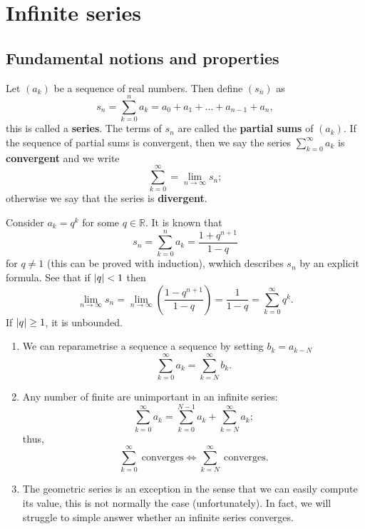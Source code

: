 \chapter{Infinite series}

\section{Fundamental notions and properties}

\begin{definition}
    Let $(a_k)$ be a sequence of real numbers. Then define $(s_n)$ as \[ s_n = \sum_{k = 0}^n a_k = a_0 + a_1 + \ldots + a_{n - 1} + a_{n}, \] this is called a \textbf{series}. The terms of $s_n$ are called the \textbf{partial sums} of $(a_k)$. If the sequence of partial sums is convergent, then we say the series $\sum_{k = 0}^\infty a_k$ is \textbf{convergent} and we write \[ \sum_{k = 0}^\infty = \lim_{n \to \infty} s_n; \] otherwise we say that the series is \textbf{divergent}.
\end{definition}

\begin{example}
    Consider $a_k = q^k$ for some $q \in \mathbb R$. It is known that \[ s_n = \sum_{k = 0}^n a_k =\frac{1 + q^{n + 1}}{1 - q} \] for $q \neq 1$ (this can be proved with induction), wwhich describes $s_n$ by an explicit formula. See that if $\lvert q\rvert < 1$ then \[ \lim_{n \to \infty} s_n = \lim_{n \to \infty} \left( \frac{1 - q^{n + 1}}{1 - q} \right) = \frac{1}{1 - q} = \sum_{k = 0}^\infty q^k. \] If $\lvert q\rvert \geq 1$, it is unbounded.
\end{example}

\begin{remark}
    \begin{enumerate}
        \item We can reparametrise a sequence a sequence by setting $b_k = a_{k - N}$ \[ \sum_{k = 0}^\infty a_k = \sum_{k = N}^\infty b_k. \]
        \item Any number of finite are unimportant in an infinite series: \[ \sum_{k = 0}^\infty a_k = \sum_{k = 0}^{N - 1} a_k + \sum_{k = N}^\infty a_k; \] thus, \[ \sum_{k = 0}^\infty \; \text{converges} \iff \sum_{k = N}^\infty \; \text{converges}. \]
        \item The geometric series is an exception in the sense that we can easily compute its value, this is not normally the case (unfortunately). In fact, we will struggle to simple answer whether an infinite series converges.
    \end{enumerate}
\end{remark}

